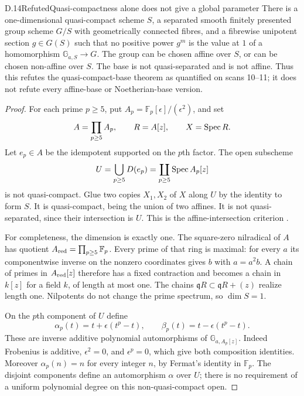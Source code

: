 \begin{statement}{D.14}{Refuted}{Quasi-compactness alone does not give a global parameter}
There is a one-dimensional quasi-compact scheme $S$, a separated
smooth finitely presented group scheme $G/S$ with geometrically connected
fibres, and a fibrewise unipotent section $g\in G(S)$ such that no
positive power $g^m$ is the value at $1$ of a homomorphism
$\mathbb G_{a,S}\to G$. The group can be chosen affine over $S$,
or can be chosen non-affine over $S$. The base is not quasi-separated
and is not affine. Thus this refutes the quasi-compact-base theorem
as quantified on scans 10--11; it does not refute every affine-base
or Noetherian-base version.
\end{statement}
\begin{proof}
For each prime $p\ge5$, put $A_p=\mathbb F_p[\epsilon]/(\epsilon^2)$,
and set
\[
 A=\prod_{p\ge5} A_p,\qquad R=A[z],\qquad X=\operatorname{Spec} R.
\]
Let $e_p\in A$ be the idempotent supported on the $p$th factor.
The open subscheme
\[
                 U=\bigcup_{p\ge5}D(e_p)
                   =\coprod_{p\ge5}\operatorname{Spec} A_p[z]
\]
is not quasi-compact. Glue two copies $X_1,X_2$ of $X$ along $U$ by
the identity to form $S$. It is quasi-compact, being the union of two
affines. It is not quasi-separated, since their intersection is $U$.
This is the affine-intersection criterion
\citep[Lemma 26.21.6]{DN_StacksSeparation}.

For completeness, the dimension is exactly one. The square-zero
nilradical of $A$ has quotient $A_{\rm red}=\prod_{p\ge5}\mathbb F_p$.
Every prime of that ring is maximal: for every $a$ its componentwise
inverse on the nonzero coordinates gives $b$ with $a=a^2b$.
A chain of primes in $A_{\rm red}[z]$ therefore has a fixed contraction
and becomes a chain in $k[z]$ for a field $k$, of length at most one.
The chains $\mathfrak qR\subset\mathfrak qR+(z)$ realize length one.
Nilpotents do not change the prime spectrum, so $\dim S=1$.

On the $p$th component of $U$ define
\[
 \alpha_p(t)=t+\epsilon(t^p-t),\qquad
 \beta_p(t)=t-\epsilon(t^p-t).
\]
These are inverse additive polynomial automorphisms of
$\mathbb G_{a,A_p[z]}$. Indeed Frobenius is additive, $\epsilon^2=0$,
and $\epsilon^p=0$, which give both composition identities. Moreover
$\alpha_p(n)=n$ for every integer $n$, by Fermat's identity in
$\mathbb F_p$. The disjoint components define an automorphism
$\alpha$ over $U$; there is no requirement of a uniform polynomial
degree on this non-quasi-compact open.


\end{proof}

